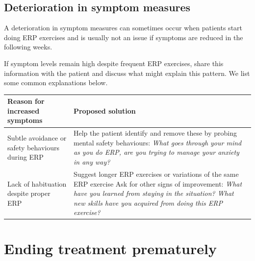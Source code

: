 \documentclass[]{book}
\theoremstyle{definition}
\theoremstyle{definition}
\theoremstyle{definition}
\theoremstyle{remark}
\begin{document}
\hypertarget{deterioration-in-symptom-measures}{%
\subsection{Deterioration in symptom
measures}\label{deterioration-in-symptom-measures}}

A deterioration in symptom measures can sometimes occur when patients
start doing ERP exercises and is usually not an issue if symptoms are
reduced in the following weeks.

If symptom levels remain high despite frequent ERP exercises, share this
information with the patient and discuss what might explain this
pattern. We list some common explanations below.

\begin{longtable}[]{@{}ll@{}}
\toprule
\begin{minipage}[b]{0.47\columnwidth}\raggedright
Reason for increased symptoms\strut
\end{minipage} & \begin{minipage}[b]{0.47\columnwidth}\raggedright
Proposed solution\strut
\end{minipage}\tabularnewline
\midrule
\endhead
\begin{minipage}[t]{0.47\columnwidth}\raggedright
Subtle avoidance or safety behaviours during ERP\strut
\end{minipage} & \begin{minipage}[t]{0.47\columnwidth}\raggedright
Help the patient identify and remove these by probing mental safety
behaviours: \emph{What goes through your mind as you do ERP, are you
trying to manage your anxiety in any way?}\strut
\end{minipage}\tabularnewline
\begin{minipage}[t]{0.47\columnwidth}\raggedright
Lack of habituation despite proper ERP\strut
\end{minipage} & \begin{minipage}[t]{0.47\columnwidth}\raggedright
Suggest longer ERP exercises or variations of the same ERP exercise Ask
for other signs of improvement: \emph{What have you learned from staying
in the situation? What new skills have you acquired from doing this ERP
exercise?}\strut
\end{minipage}\tabularnewline
\bottomrule
\end{longtable}

\hypertarget{ending-treatment-prematurely}{%
\section{Ending treatment
prematurely}\label{ending-treatment-prematurely}}
\end{document}
